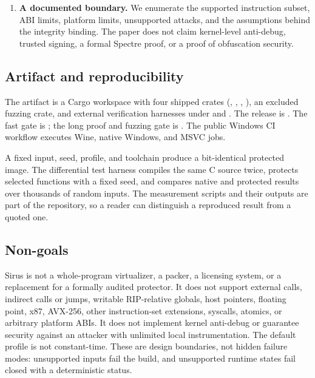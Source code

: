 \begin{enumerate}
  \item \textbf{A documented boundary.} We enumerate the supported instruction
        subset, ABI limits, platform limits, unsupported attacks, and the
        assumptions behind the integrity binding. The paper does not claim
        kernel-level anti-debug, trusted signing, a formal Spectre proof, or a
        proof of obfuscation security.
\end{enumerate}

\subsection{Artifact and reproducibility}

The artifact is a Cargo workspace with four shipped crates
(, , ,
), an excluded fuzzing crate, and external verification
harnesses under  and . The release is
. The fast gate is ; the long proof
and fuzzing gate is . The public Windows CI workflow
executes Wine, native Windows, and MSVC  jobs.

A fixed input, seed, profile, and toolchain produce a bit-identical protected
image. The differential test harness compiles the same C source twice, protects
selected functions with a fixed seed, and compares native and protected results
over thousands of random inputs. The measurement scripts and their outputs are
part of the repository, so a reader can distinguish a reproduced result from a
quoted one.

\subsection{Non-goals}

Sirus is not a whole-program virtualizer, a packer, a licensing system, or a
replacement for a formally audited protector. It does not support external
calls, indirect calls or jumps, writable RIP-relative globals, host pointers,
floating point, x87, AVX-256, other instruction-set extensions, syscalls,
atomics, or arbitrary platform ABIs. It does not implement kernel anti-debug or
guarantee security against an attacker with unlimited local instrumentation. The
default profile is not constant-time. These are design boundaries, not hidden
failure modes: unsupported inputs fail the build, and unsupported runtime states
fail closed with a deterministic status.

